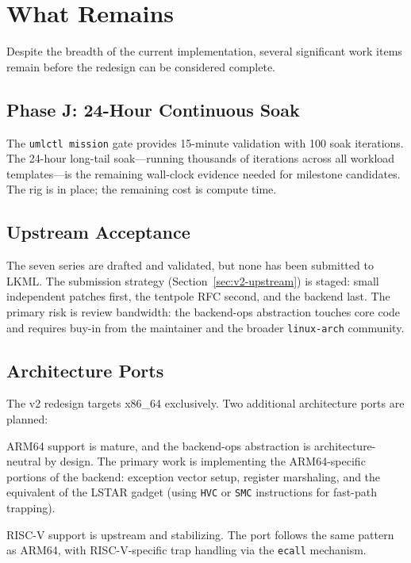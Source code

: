 \section{What Remains}
\label{sec:conclusion-remaining}

Despite the breadth of the current implementation, several significant
work items remain before the redesign can be considered complete.

\subsection{Phase J: 24-Hour Continuous Soak}

The \texttt{umlctl mission} gate provides 15-minute validation with
100 soak iterations.  The 24-hour long-tail soak---running thousands
of iterations across all workload templates---is the remaining
wall-clock evidence needed for milestone candidates.  The rig is in
place; the remaining cost is compute time.

\subsection{Upstream Acceptance}

The seven series are drafted and validated, but none has been
submitted to LKML.  The submission strategy
(Section~\ref{sec:v2-upstream}) is staged: small independent patches
first, the tentpole RFC second, and the \KVM{} backend last.  The
primary risk is review bandwidth: the backend-ops abstraction touches
core \UML{} code and requires buy-in from the \UML{} maintainer and
the broader \texttt{linux-arch} community.

\subsection{Architecture Ports}

The v2 redesign targets x86\_64 exclusively.  Two additional
architecture ports are planned:

\begin{description}[style=nextline,leftmargin=2em]
  \item[ARM64 (\texttt{aarch64}).]
    ARM64 \KVM{} support is mature, and the backend-ops abstraction is
    architecture-neutral by design.  The primary work is implementing
    the ARM64-specific portions of the \KVMvTwo{} backend: exception
    vector setup, register marshaling, and the equivalent of the
    LSTAR gadget (using \texttt{HVC} or \texttt{SMC} instructions for
    fast-path trapping).

  \item[RISC-V.]
    RISC-V \KVM{} support is upstream and stabilizing.  The port
    follows the same pattern as ARM64, with RISC-V-specific trap
    handling via the \texttt{ecall} mechanism.
\end{description}


